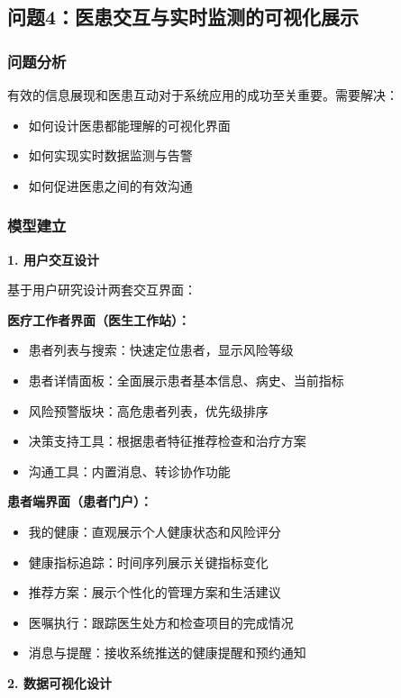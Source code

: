 \subsection{问题4：医患交互与实时监测的可视化展示}

\subsubsection{问题分析}

有效的信息展现和医患互动对于系统应用的成功至关重要。需要解决：
\begin{itemize}[itemindent=2em]
\item 如何设计医患都能理解的可视化界面
\item 如何实现实时数据监测与告警
\item 如何促进医患之间的有效沟通
\end{itemize}

\subsubsection{模型建立}

\textbf{1. 用户交互设计}

基于用户研究设计两套交互界面：

\textbf{医疗工作者界面（医生工作站）：}
\begin{itemize}[itemindent=2em]
\item 患者列表与搜索：快速定位患者，显示风险等级
\item 患者详情面板：全面展示患者基本信息、病史、当前指标
\item 风险预警版块：高危患者列表，优先级排序
\item 决策支持工具：根据患者特征推荐检查和治疗方案
\item 沟通工具：内置消息、转诊协作功能
\end{itemize}

\textbf{患者端界面（患者门户）：}
\begin{itemize}[itemindent=2em]
\item 我的健康：直观展示个人健康状态和风险评分
\item 健康指标追踪：时间序列展示关键指标变化
\item 推荐方案：展示个性化的管理方案和生活建议
\item 医嘱执行：跟踪医生处方和检查项目的完成情况
\item 消息与提醒：接收系统推送的健康提醒和预约通知
\end{itemize}

\textbf{2. 数据可视化设计}

